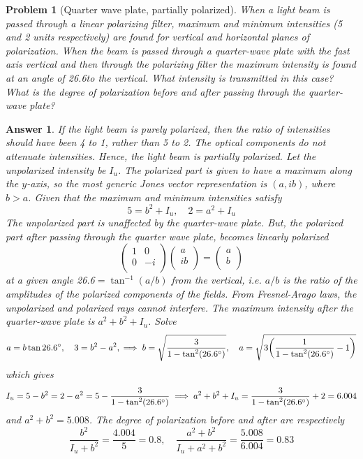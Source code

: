 \documentclass[a4paper]{article}
\newtheorem{ans}{Answer}
\theoremstyle{new}
\newtheorem{qns}{Problem}
\begin{document}
\begin{qns}[Quarter wave plate, partially polarized]
When a light beam is passed through a linear polarizing filter, maximum and minimum intensities (5 and 2 units respectively) are found for vertical and horizontal planes of polarization. When the beam is passed through a quarter-wave plate with the fast axis vertical and then through the polarizing filter the maximum intensity is found at an angle of 26.6\degree to the vertical. What intensity is transmitted in this case? What is the degree of polarization before and after passing through the quarter-wave plate?
\end{qns}
\begin{ans}
If the light beam is purely polarized, then the ratio of intensities should have been 4 to 1, rather than 5 to 2. The optical components do not attenuate intensities. Hence, the light beam is partially polarized. Let the unpolarized intensity be $I_u$. The polarized part is given to have a maximum along the $y$-axis, so the most generic Jones vector representation is $(a,ib)$, where $b>a$. Given that the maximum and minimum intensities satisfy
$$5=b^2+I_u,\quad 2=a^2+I_u$$
The unpolarized part is unaffected by the quarter-wave plate. But, the polarized part after passing through the quarter wave plate, becomes linearly polarized
$$\begin{pmatrix}1&0\\0&-i\\\end{pmatrix}\begin{pmatrix}a\\ib\\\end{pmatrix}=\begin{pmatrix}a\\b\\\end{pmatrix}$$
at a given angle 26.6\degree$=\tan^{-1}(a/b)$ from the vertical, i.e. $a/b$ is the ratio of the amplitudes of the polarized components of the fields. From Fresnel-Arago laws, the unpolarized and polarized rays cannot interfere. The maximum intensity after the quarter-wave plate is $a^2+b^2+I_u$. Solve
$$a=b\tan26.6\degree,\quad 3=b^2-a^2,\implies b=\sqrt{\frac{3}{1-\tan^2(26.6\degree)}},\quad  a=\sqrt{3\bigg(\frac{1}{1-\tan^2(26.6\degree)}-1\bigg)}$$
which gives
$$I_u=5-b^2=2-a^2=5-\frac{3}{1-\tan^2(26.6\degree)}\implies a^2+b^2+I_u=\frac{3}{1-\tan^2(26.6\degree)}+2=6.004$$
and $a^2+b^2=5.008$. The degree of polarization before and after are respectively
$$\frac{b^2}{I_u+b^2}=\frac{4.004}{5}=0.8,\quad\frac{a^2+b^2}{I_u+a^2+b^2}=\frac{5.008}{6.004}=0.83$$
\end{ans}
\end{document}
